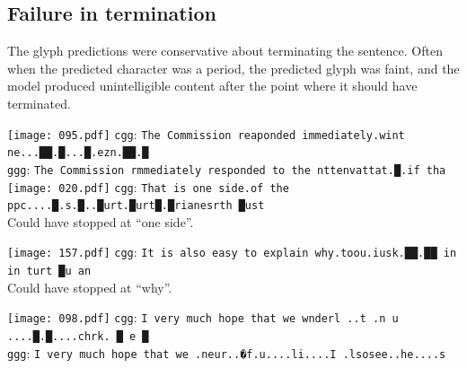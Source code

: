 \documentclass[11pt,twocolumn]{article}
\begin{document}



\subsection{Failure in termination}\label{sec:failure-termination}

The glyph predictions were conservative about terminating the sentence.
Often when the predicted character was a period,
the predicted glyph was faint,
and the model produced unintelligible content after the point where it should have terminated.

\vspace{1.2em}\noindent\texttt{[image: 095.pdf]}
\texttt{cgg}: \texttt{The Commission reaponded immediately.wint ne...██.█...█.ezn.██.█}\\
\texttt{ggg}: \texttt{The Commission rmmediately responded to the nttenvattat.█.if tha}\\

\vspace{1.2em}\noindent\texttt{[image: 020.pdf]}
\texttt{cgg}: \texttt{That is one side.of the ppc....█.s.█..█urt.█urt█.█rianesrth █ust}\\

\vspace{-0.8em}
Could have stopped at ``one side''.

\vspace{1.2em}\noindent\texttt{[image: 157.pdf]}
\texttt{cgg}: \texttt{It is also easy to explain why.toou.iusk.██.██ in in turt █u an}\\

\vspace{-0.8em}
Could have stopped at ``why''.

\vspace{1.2em}\noindent\texttt{[image: 098.pdf]}
\texttt{cgg}: \texttt{I very much hope that we wnderl ..t  .n u ....█.█....chrk. █ e █}\\
\texttt{ggg}: \texttt{I very much hope that we .neur..�f.u....li....I .lsosee..he....s}\\
\end{document}
